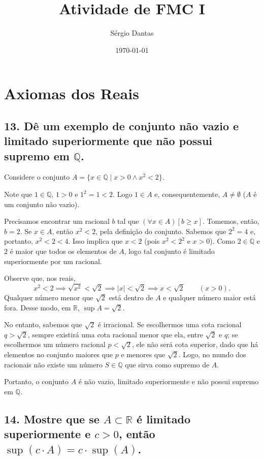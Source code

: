 \documentclass[12pt]{article}
\title{Atividade de FMC I}
\author{Sérgio Dantas}
\date{\today}
\begin{document}
	\maketitle
	
	\section*{\centering Axiomas dos Reais}
	
	\subsection*{13. Dê um exemplo de conjunto não vazio e limitado superiormente que não possui supremo em $\mathbb{Q}$.}
	
	Considere o conjunto $A = \{ x \in \mathbb{Q} \mid x > 0 \land x^2 < 2 \}$.
	
	Note que $1 \in \mathbb{Q}$, $1 > 0$ e $1^2 = 1 < 2$. Logo $1 \in A$ e, consequentemente, $A \neq \emptyset$ ($A$ é um conjunto não vazio).
	
	Precisamos encontrar um racional $b$ tal que $(\forall x \in A)[b \geq x]$. Tomemos, então, $b = 2$. Se $x \in A$, então $x^2 < 2$, pela definição do conjunto. Sabemos que $2^2 = 4$ e, portanto, $x^2 < 2 < 4$. Isso implica que $x < 2$ (pois $x^2 < 2^2$ e $x > 0$). Como $2 \in \mathbb{Q}$ e $2$ é maior que todos os elementos de $A$, logo tal conjunto é limitado superiormente por um racional.
	
	Observe que, nos reais,
	\[
	x^2 < 2 \implies \sqrt{x^2} < \sqrt{2} \implies |x| < \sqrt{2} \implies x < \sqrt{2} \qquad (x > 0).
	\]
	Qualquer número menor que $\sqrt{2}$ está dentro de $A$ e qualquer número maior está fora. Desse modo, em $\mathbb{R}$, $\sup{A} = \sqrt{2}$.
	
	No entanto, sabemos que $\sqrt{2}$ é irracional. Se escolhermos uma cota racional $q > \sqrt{2}$, sempre existirá uma cota racional menor que ela, entre $\sqrt{2}$ e $q$; se escolhermos um número racional $p < \sqrt{2}$, ele não será cota superior, dado que há elementos no conjunto maiores que $p$ e menores que $\sqrt{2}$. Logo, no mundo dos racionais não existe um número $S \in \mathbb{Q}$ que sirva como supremo de $A$.
	
	Portanto, o conjunto $A$ é não vazio, limitado superiormente e não possui supremo em $\mathbb{Q}$. \blacksquare
	
	\subsection*{14. Mostre que se $A \subset \mathbb{R}$ é limitado superiormente e $c > 0$, então $\sup(c \cdot A) = c \cdot \sup(A)$.}
	
\end{document}
